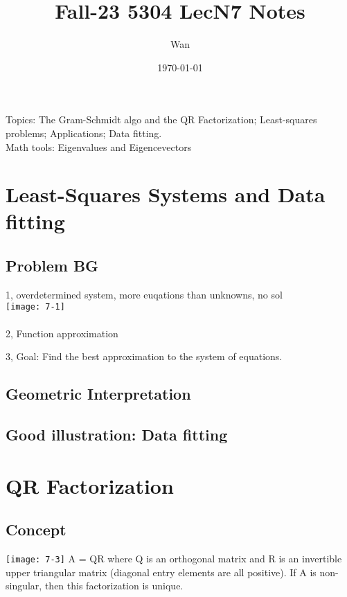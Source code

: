 \documentclass{article}
\begin{document}
\title{Fall-23 5304 LecN7 Notes}
\author{Wan}
\date{\today}
\maketitle

\noindent
Topics: The Gram-Schmidt algo and the QR Factorization; Least-squares problems; Applications; Data fitting.\\


\noindent
Math tools: Eigenvalues and Eigencevectors

\section{Least-Squares Systems and Data fitting}
\subsection*{Problem BG}
1, overdetermined system, more euqations than unknowns, no sol\\
\texttt{[image: 7-1]}\\
\\
2, Function approximation

3, Goal: Find the best approximation to the system of equations.\\

\subsection*{Geometric Interpretation}

\subsection*{Good illustration: Data fitting}

\pagebreak
\section{QR Factorization}


\subsection{Concept}
\texttt{[image: 7-3]}
A = QR where Q is an orthogonal matrix and R is an invertible upper triangular matrix (diagonal entry elements are all positive).
If A is non-singular, then this factorization is unique.\\
\end{document}
